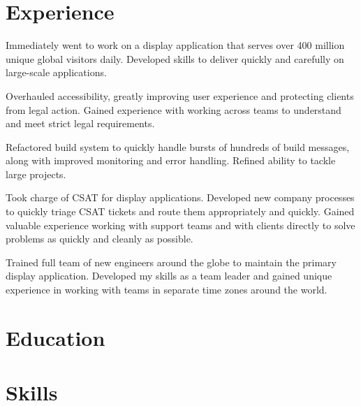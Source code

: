 \documentclass[11pt,a4paper,sans]{moderncv}
\begin{document}
\makecvtitle %


\section{Experience}

\cvlistitem
{Immediately went to work on a display application that serves over 400 million unique global visitors daily. Developed skills to deliver quickly and carefully on large-scale applications.}

\cvlistitem
{Overhauled accessibility, greatly improving user experience and protecting clients from legal action. Gained experience with working across teams to understand and meet strict legal requirements.}

\cvlistitem
{Refactored build system to quickly handle bursts of hundreds of build messages, along with improved monitoring and error handling. Refined ability to tackle large projects.}

\cvlistitem
{Took charge of CSAT for display applications. Developed new company processes to quickly triage CSAT tickets and route them appropriately and quickly. Gained valuable experience working with support teams and with clients directly to solve problems as quickly and cleanly as possible.}

\cvlistitem
{Trained full team of new engineers around the globe to maintain the primary display application. Developed my skills as a team leader and gained unique experience in working with teams in separate time zones around the world.}

\section{Education}




\section{Skills}


\end{document}
